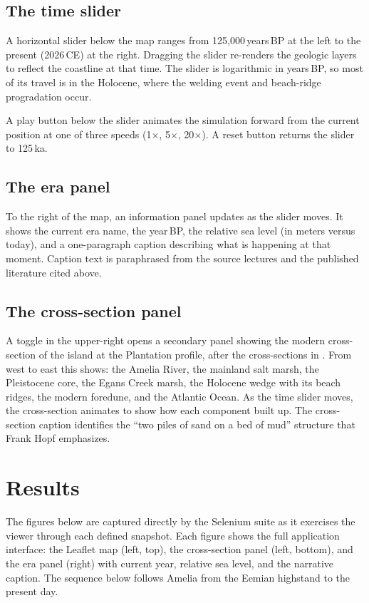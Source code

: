 \documentclass[11pt]{article}
\begin{document}
\subsection{The time slider}

A horizontal slider below the map ranges from 125{,}000\,years\,BP at the left
to the present (2026\,CE) at the right. Dragging the slider re-renders the
geologic layers to reflect the coastline at that time. The slider is
logarithmic in years\,BP, so most of its travel is in the Holocene, where the
welding event and beach-ridge progradation occur.

A play button below the slider animates the simulation forward from the current
position at one of three speeds (1$\times$, 5$\times$, 20$\times$). A reset
button returns the slider to 125\,ka.

\subsection{The era panel}

To the right of the map, an information panel updates as the slider moves. It
shows the current era name, the year\,BP, the relative sea level (in meters
versus today), and a one-paragraph caption describing what is happening at that
moment. Caption text is paraphrased from the source lectures
\cite{cn_hopf,cn_dunes1,cn_dunes2} and the published literature cited above.

\subsection{The cross-section panel}

A toggle in the upper-right opens a secondary panel showing the modern
cross-section of the island at the Plantation profile, after the cross-sections
in \cite{cn_hopf,cn_dunes1,cn_dunes2}. From west to east this shows: the Amelia River,
the mainland salt marsh, the Pleistocene core, the Egans Creek marsh, the
Holocene wedge with its beach ridges, the modern foredune, and the Atlantic
Ocean. As the time slider moves, the cross-section animates to show how each
component built up. The cross-section caption identifies the ``two piles of
sand on a bed of mud'' structure that Frank Hopf emphasizes.

\section{Results}

The figures below are captured directly by the Selenium suite as it exercises
the viewer through each defined snapshot. Each figure shows the full
application interface: the Leaflet map (left, top), the cross-section panel
(left, bottom), and the era panel (right) with current year, relative sea
level, and the narrative caption. The sequence below follows Amelia from the
Eemian highstand to the present day.
\end{document}
